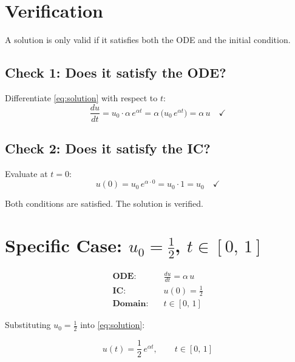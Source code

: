 \documentclass[11pt]{article}
\newcommand{\dd}[2]{\frac{d #1}{d #2}}
\begin{document}
\section{Verification}

A solution is only valid if it satisfies both the ODE and the initial condition.

\subsection{Check 1: Does it satisfy the ODE?}

Differentiate \eqref{eq:solution} with respect to $t$:
\begin{equation}
  \dd{u}{t} = u_0 \cdot \alpha\,e^{\alpha t} = \alpha\,\bigl(u_0\,e^{\alpha t}\bigr) = \alpha\,u \quad\checkmark
\end{equation}

\subsection{Check 2: Does it satisfy the IC?}

Evaluate at $t = 0$:
\begin{equation}
  u(0) = u_0\,e^{\alpha \cdot 0} = u_0 \cdot 1 = u_0 \quad\checkmark
\end{equation}

Both conditions are satisfied. The solution is verified.

\section{Specific Case: $u_0 = \tfrac{1}{2}$, $t \in [0,\,1]$}

\begin{tcolorbox}[colback=red!5, colframe=red!50!black, title=Specific Problem]
\begin{align}
  \textbf{ODE:}& \quad \dd{u}{t} = \alpha\,u \\[6pt]
  \textbf{IC:}& \quad u(0) = \tfrac{1}{2} \\[6pt]
  \textbf{Domain:}& \quad t \in [0,\,1]
\end{align}
\end{tcolorbox}

\medskip
\noindent
Substituting $u_0 = \frac{1}{2}$ into \eqref{eq:solution}:

\begin{equation}
  \boxed{u(t) = \frac{1}{2}\,e^{\alpha t}, \qquad t \in [0,\,1]}
  \label{eq:specific}
\end{equation}
\end{document}
